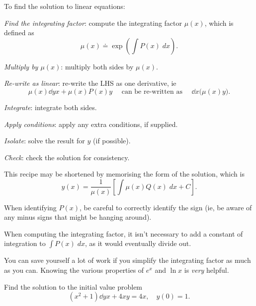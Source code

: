 \documentclass{book}
\begin{document}
To find the solution to linear equations:
\begin{enumerate*}
\item \emph{Find the integrating factor}: compute the integrating
  factor $\mu(x)$, which is defined as
  \begin{equation*}
    \mu(x) \doteq \exp \left( \int P(x) \;dx \right).
  \end{equation*}
\item \emph{Multiply by $\mu(x)$}: multiply both sides by $\mu(x)$.
\item \emph{Re-write as linear}: re-write the LHS as one derivative, ie
  \begin{equation*}
    \mu(x) \dd{y}{x} + \mu(x) P(x) y \quad \text{ can be re-written as } \quad \dd{}{x} \bigl( \mu(x) y \bigr).
  \end{equation*}
\item \emph{Integrate}: integrate both sides.
\item \emph{Apply conditions}: apply any extra conditions, if supplied.
\item \emph{Isolate}: solve the result for $y$ (if possible).
\item \emph{Check}: check the solution for consistency.
\end{enumerate*}

This recipe may be shortened by memorising the form of the solution,
which is
\begin{equation*}
  y(x) = \frac{1}{\mu(x)} \left[ \int \mu(x) Q(x) \;dx + C \right].
\end{equation*}

\begin{heads}
  When identifying $P(x)$, be careful to correctly identify the sign
  (ie, be aware of any minus signs that might be hanging around).
\end{heads}

\begin{heads}
  When computing the integrating factor, it isn't necessary to add a
  constant of integration to $\int P(x)\; dx$, as it would eventually
  divide out.
\end{heads}

\begin{heads}
  You can save yourself a lot of work if you simplify the integrating
  factor as much as you can.  Knowing the various properties of $e^x$
  and $\ln x$ is \emph{very} helpful.
\end{heads}

\newpage
\begin{example}
  Find the solution to the initial value problem
  \begin{equation*}
    (x^2 + 1) \dd{y}{x} + 4xy = 4x, \quad y(0) = 1.
  \end{equation*}
\end{example}
\end{document}

